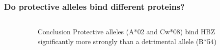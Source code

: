 \documentclass[slidescentered,compress]{beamer}
\begin{document}
%
%
%
%

\frame
{
\frametitle{Do protective alleles bind different proteins?}

\begin{columns}[c]

\begin{column}{6cm}
\begin{figure}
\end{figure}
\end{column}

\pause

\begin{column}{4cm}
\begin{block}{Conclusion}
Protective alleles (A*02 and Cw*08) bind HBZ significantly more strongly than a detrimental allele (B*54)
\end{block}
\end{column}

\end{columns}
}
\end{document}
